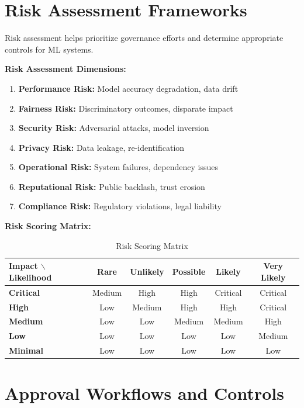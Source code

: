 \section{Risk Assessment Frameworks}

Risk assessment helps prioritize governance efforts and determine appropriate controls for ML systems.

\textbf{Risk Assessment Dimensions:}

\begin{enumerate}
    \item \textbf{Performance Risk:} Model accuracy degradation, data drift
    \item \textbf{Fairness Risk:} Discriminatory outcomes, disparate impact
    \item \textbf{Security Risk:} Adversarial attacks, model inversion
    \item \textbf{Privacy Risk:} Data leakage, re-identification
    \item \textbf{Operational Risk:} System failures, dependency issues
    \item \textbf{Reputational Risk:} Public backlash, trust erosion
    \item \textbf{Compliance Risk:} Regulatory violations, legal liability
\end{enumerate}

\textbf{Risk Scoring Matrix:}

\begin{table}[h]
\centering
\begin{tabular}{|l|c|c|c|c|c|}
\hline
\textbf{Impact $\backslash$ Likelihood} & \textbf{Rare} & \textbf{Unlikely} & \textbf{Possible} & \textbf{Likely} & \textbf{Very Likely} \\
\hline
\textbf{Critical} & Medium & High & High & Critical & Critical \\
\hline
\textbf{High} & Low & Medium & High & High & Critical \\
\hline
\textbf{Medium} & Low & Low & Medium & Medium & High \\
\hline
\textbf{Low} & Low & Low & Low & Low & Medium \\
\hline
\textbf{Minimal} & Low & Low & Low & Low & Low \\
\hline
\end{tabular}
\caption{Risk Scoring Matrix}
\end{table}

\section{Approval Workflows and Controls}

